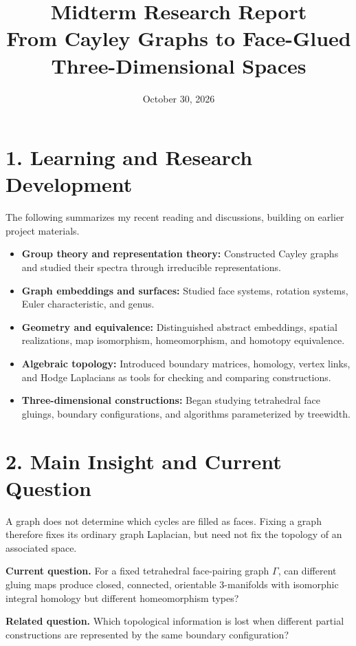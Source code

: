 \documentclass[11pt,a4paper]{article}
\title{\vspace{-1.6cm}Midterm Research Report\\[3pt]\large From Cayley Graphs to Face-Glued Three-Dimensional Spaces}
\author{}
\date{October 30, 2026}
\begin{document}
\maketitle
\vspace{-1.2cm}

\section*{1. Learning and Research Development}
The following summarizes my recent reading and discussions, building on earlier project materials.
\begin{itemize}
\item \textbf{Group theory and representation theory:} Constructed Cayley graphs and studied their spectra through irreducible representations.
\item \textbf{Graph embeddings and surfaces:} Studied face systems, rotation systems, Euler characteristic, and genus.
\item \textbf{Geometry and equivalence:} Distinguished abstract embeddings, spatial realizations, map isomorphism, homeomorphism, and homotopy equivalence.
\item \textbf{Algebraic topology:} Introduced boundary matrices, homology, vertex links, and Hodge Laplacians as tools for checking and comparing constructions.
\item \textbf{Three-dimensional constructions:} Began studying tetrahedral face gluings, boundary configurations, and algorithms parameterized by treewidth.
\end{itemize}

\section*{2. Main Insight and Current Question}
A graph does not determine which cycles are filled as faces. Fixing a graph therefore fixes its ordinary graph Laplacian, but need not fix the topology of an associated space.

\textbf{Current question.} For a fixed tetrahedral face-pairing graph $\Gamma$, can different gluing maps produce closed, connected, orientable $3$-manifolds with isomorphic integral homology but different homeomorphism types?

\textbf{Related question.} Which topological information is lost when different partial constructions are represented by the same boundary configuration?
\end{document}
